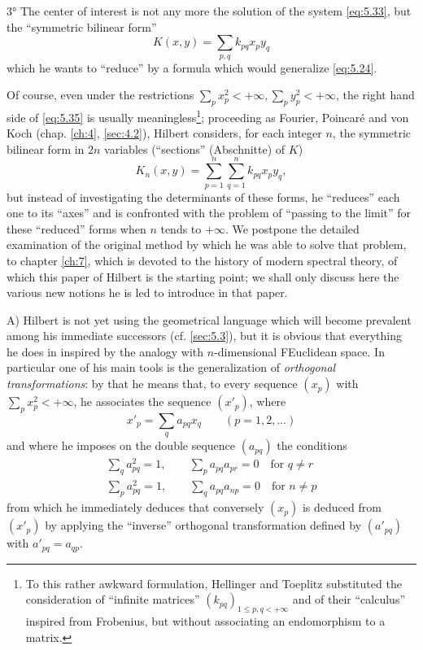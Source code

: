 \documentclass[12pt,a4paper,leqno,twoside]{extbook}
\begin{document}
3° The center of interest is not any more the solution of the system \eqref{eq:5.33}, but the ``symmetric bilinear form''
\begin{equation}
    \label{eq:5.35}
    K(x,y) = \sum_{p,q} k_{pq} x_p y_q
\end{equation}
which he wants to ``reduce'' by a formula which would generalize \eqref{eq:5.24}.

Of course, even under the restrictions \(\sum\limits_p x_p^2 < +\infty, \sum\limits_p y_p^2 < +\infty\), the right hand side of \eqref{eq:5.35} is usually meaningless\footnote{To this rather awkward formulation, Hellinger and Toeplitz \cite{106} substituted the consideration of ``infinite matrices'' \((k_{pq})_{1 \leq p, q < +\infty}\) and of their ``calculus'' inspired from Frobenius, but without associating an endomorphism to a matrix.}; proceeding as Fourier, Poincaré and von Koch (chap. \ref{ch:4}, \ref{sec:4.2}), Hilbert considers, for each integer \(n\), the symmetric bilinear form in \(2n\) variables (``sections'' (Abschnitte) of \(K\))
\begin{equation}
    \label{eq:5.36}
    K_n(x,y) = \sum_{p=1}^n \sum_{q=1}^n k_{pq} x_p y_q,
\end{equation}
but instead of investigating the determinants of these forms, he ``reduces'' each one to its ``axes'' and is confronted with the problem of ``passing to the limit'' for these ``reduced'' forms when \(n\) tends to \(+\infty\). We postpone the detailed examination of the original method by which he was able to solve that problem, to chapter \ref{ch:7}, which is devoted to the history of modern spectral theory, of which this paper of Hilbert is the starting point; we shall only discuss here the various new notions he is led to introduce in that paper.

A) Hilbert is not yet using the geometrical language which will become prevalent among his immediate successors (cf. \ref{sec:5.3}), but it is obvious that everything he does in inspired by the analogy with \(n\)-dimensional FEuclidean space. In particular one of his main tools is the generalization of \emph{orthogonal transformations}: by that he means that, to every sequence \((x_p)\) with \(\sum\limits_p x_p^2 < +\infty\), he associates the sequence \((x'_p)\), where
\begin{equation}
    \label{eq:5.37}
    x'_p = \sum_q a_{pq} x_q \qquad (p=1,2,\ldots)
\end{equation}
and where he imposes on the double sequence \((a_{pq})\) the conditions
\begin{equation}
    \label{eq:5.38}
    \begin{gathered}
        \sum_q a_{pq}^2 = 1, \qquad \sum_p a_{pq} a_{pr} = 0 \quad \text{for } q \neq r \\
        \sum_p a_{pq}^2 = 1, \qquad \sum_q a_{pq} a_{np} = 0 \quad \text{for } n \neq p
    \end{gathered}
\end{equation}
from which he immediately deduces that conversely \((x_p)\) is deduced from \((x'_p)\) by applying the ``inverse'' orthogonal transformation defined by \((a'_{pq})\) with \(a'_{pq} = a_{qp}\).
\end{document}
